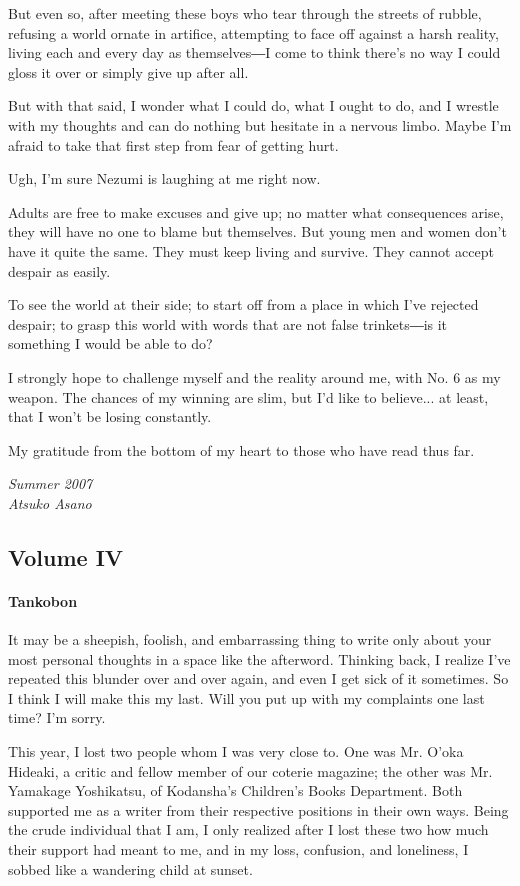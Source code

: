 But even so, after meeting these boys who tear through the streets of
rubble, refusing a world ornate in artifice, attempting to face off
against a harsh reality, living each and every day as themselves―I come
to think there's no way I could gloss it over or simply give up after
all.

But with that said, I wonder what I could do, what I ought to do, and I
wrestle with my thoughts and can do nothing but hesitate in a nervous
limbo. Maybe I'm afraid to take that first step from fear of getting
hurt.

Ugh, I'm sure Nezumi is laughing at me right now.

Adults are free to make excuses and give up; no matter what consequences
arise, they will have no one to blame but themselves. But young men and
women don't have it quite the same. They must keep living and survive.
They cannot accept despair as easily.

To see the world at their side; to start off from a place in which I've
rejected despair; to grasp this world with words that are not false
trinkets―is it something I would be able to do?

I strongly hope to challenge myself and the reality around me, with No.
6 as my weapon. The chances of my winning are slim, but I'd like to
believe... at least, that I won't be losing constantly.

My gratitude from the bottom of my heart to those who have read thus
far.

\myspace

\emph{Summer 2007\\
	Atsuko Asano}

\subsection{Volume IV}
\paragraph{Tankobon}

It may be a sheepish, foolish, and embarrassing thing to write only
about your most personal thoughts in a space like the afterword.
Thinking back, I realize I've repeated this blunder over and over again,
and even I get sick of it sometimes. So I think I will make this my
last. Will you put up with my complaints one last time? I'm sorry.

This year, I lost two people whom I was very close to. One was Mr. O'oka
Hideaki, a critic and fellow member of our coterie magazine; the other
was Mr. Yamakage Yoshikatsu, of Kodansha's Children's Books Department.
Both supported me as a writer from their respective positions in their
own ways. Being the crude individual that I am, I only realized after I
lost these two how much their support had meant to me, and in my loss,
confusion, and loneliness, I sobbed like a wandering child at sunset.


